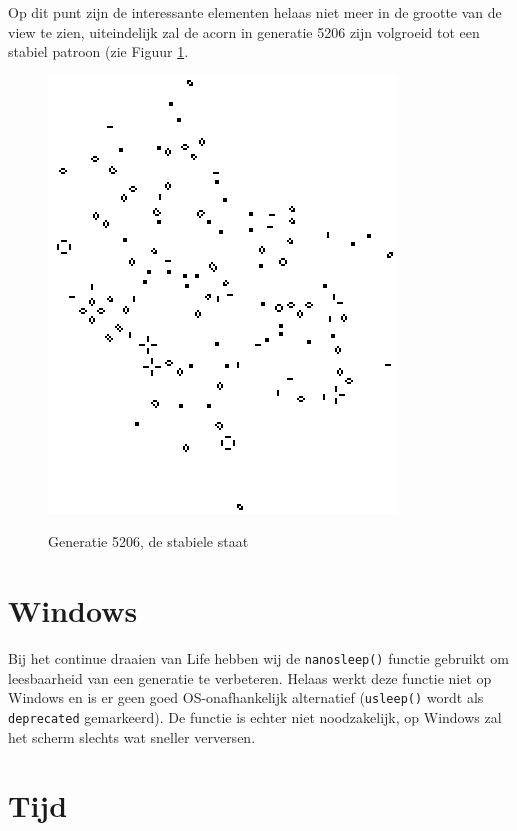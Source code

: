 \documentclass[10pt]{article}
\begin{document}
Op dit punt zijn de interessante elementen helaas niet meer in de grootte van de view te zien, uiteindelijk zal de acorn in generatie 5206 zijn volgroeid tot een stabiel patroon (zie Figuur \ref{fig:final}.

\begin{figure}[!ht]
\begin{center}
{\includegraphics[scale=0.5]{Acorn_final.png}}
\caption{Generatie 5206, de stabiele staat \cite{acorn}}\label{fig:final}
\end{center}
\end{figure}

\newpage

\section{Windows}

Bij het continue draaien van Life hebben wij de \verb+nanosleep()+ functie gebruikt om leesbaarheid van een generatie te verbeteren. Helaas werkt deze functie niet op Windows en is er geen goed OS-onafhankelijk alternatief (\verb+usleep()+ wordt als \verb+deprecated+ gemarkeerd). De functie is echter niet noodzakelijk, op Windows zal het scherm slechts wat sneller verversen.

\section{Tijd}
\end{document}
